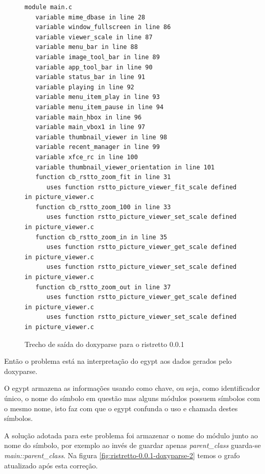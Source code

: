 \begin{figure}[h]
\begin{Verbatim}[frame=single,fontsize=\relsize{-3},fontfamily=courier]
module main.c
   variable mime_dbase in line 28
   variable window_fullscreen in line 86
   variable viewer_scale in line 87
   variable menu_bar in line 88
   variable image_tool_bar in line 89
   variable app_tool_bar in line 90
   variable status_bar in line 91
   variable playing in line 92
   variable menu_item_play in line 93
   variable menu_item_pause in line 94
   variable main_hbox in line 96
   variable main_vbox1 in line 97
   variable thumbnail_viewer in line 98
   variable recent_manager in line 99
   variable xfce_rc in line 100
   variable thumbnail_viewer_orientation in line 101
   function cb_rstto_zoom_fit in line 31
      uses function rstto_picture_viewer_fit_scale defined in picture_viewer.c
   function cb_rstto_zoom_100 in line 33
      uses function rstto_picture_viewer_set_scale defined in picture_viewer.c
   function cb_rstto_zoom_in in line 35
      uses function rstto_picture_viewer_get_scale defined in picture_viewer.c
      uses function rstto_picture_viewer_set_scale defined in picture_viewer.c
   function cb_rstto_zoom_out in line 37
      uses function rstto_picture_viewer_get_scale defined in picture_viewer.c
      uses function rstto_picture_viewer_set_scale defined in picture_viewer.c
\end{Verbatim}
\caption{Trecho de saída do doxyparse para o ristretto 0.0.1}
\label{fig:trecho-saida-doxyparse-ristretto}
\end{figure}

Então o problema está na interpretação do egypt aos dados gerados pelo doxyparse.

O egypt armazena as informações usando como chave, ou seja, como identificador
único, o nome do símbolo em questão mas alguns módulos possuem símbolos com o
mesmo nome, isto faz com que o egypt confunda o uso e chamada destes símbolos.

A solução adotada para este problema foi armazenar o nome do módulo junto ao
nome do símbolo, por exemplo ao invés de guardar apenas {\it parent\_class} guarda-se
{\it main::parent\_class}. Na figura \ref{fig:ristretto-0.0.1-doxyparse-2} temos o
grafo atualizado após esta correção.

